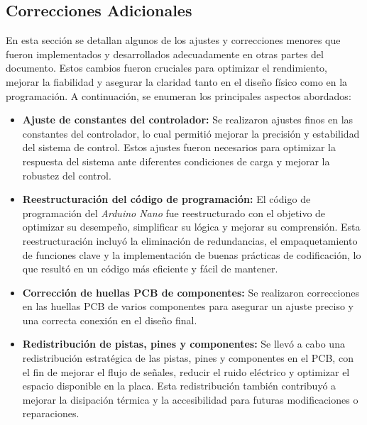 \subsection{Correcciones Adicionales}
En esta sección se detallan algunos de los ajustes y correcciones menores que fueron implementados y desarrollados adecuadamente en otras partes del documento. Estos cambios fueron cruciales para optimizar el rendimiento, mejorar la fiabilidad y asegurar la claridad tanto en el diseño físico como en la programación. A continuación, se enumeran los principales aspectos abordados:
\begin{itemize}
    \item \textbf{Ajuste de constantes del controlador:} Se realizaron ajustes finos en las constantes del controlador, lo cual permitió mejorar la precisión y estabilidad del sistema de control. Estos ajustes fueron necesarios para optimizar la respuesta del sistema ante diferentes condiciones de carga y mejorar la robustez del control.
    \item \textbf{Reestructuración del código de programación:} El código de programación del \textit{Arduino Nano} fue reestructurado con el objetivo de optimizar su desempeño, simplificar su lógica y mejorar su comprensión. Esta reestructuración incluyó la eliminación de redundancias, el empaquetamiento de funciones clave y la implementación de buenas prácticas de codificación, lo que resultó en un código más eficiente y fácil de mantener.
    \item \textbf{Corrección de huellas PCB de componentes:} Se realizaron correcciones en las huellas PCB de varios componentes para asegurar un ajuste preciso y una correcta conexión en el diseño final. 
    \item \textbf{Redistribución de pistas, pines y componentes:} Se llevó a cabo una redistribución estratégica de las pistas, pines y componentes en el PCB, con el fin de mejorar el flujo de señales, reducir el ruido eléctrico y optimizar el espacio disponible en la placa. Esta redistribución también contribuyó a mejorar la disipación térmica y la accesibilidad para futuras modificaciones o reparaciones.
\end{itemize}

